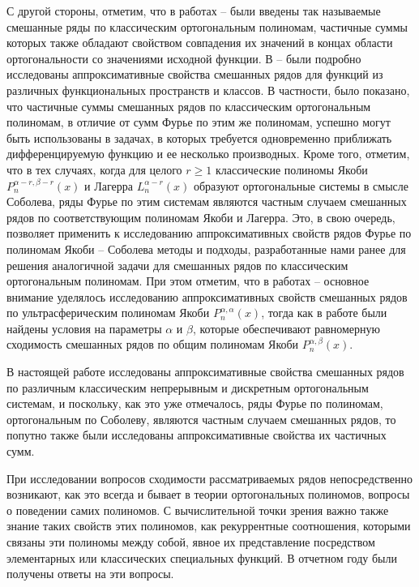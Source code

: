С другой стороны, отметим, что в работах  \cite{sob-jac-discrete-Shar11} -- \cite{sob-jac-discrete-Shar18}  были введены так называемые смешанные ряды по классическим ортогональным полиномам, частичные суммы которых также обладают свойством совпадения их значений в концах области ортогональности со значениями исходной функции.  В \cite{sob-jac-discrete-Shar11} -- \cite{sob-jac-discrete-Shar18} были подробно исследованы аппроксимативные свойства смешанных рядов для функций из различных функциональных пространств и классов. В частности, было показано, что частичные суммы смешанных рядов по классическим ортогональным полиномам, в отличие от сумм Фурье по этим же полиномам, успешно могут быть использованы в задачах, в которых требуется одновременно приближать дифференцируемую функцию и ее несколько производных. Кроме того, отметим, что в тех случаях, когда для целого $r\ge1$ классические полиномы Якоби $P_n^{\alpha-r,\beta-r}(x)$ и Лагерра $L_n^{\alpha-r}(x)$ образуют ортогональные системы в смысле Соболева, ряды Фурье по этим системам являются частным случаем смешанных рядов по соответствующим полиномам Якоби и Лагерра. Это, в свою очередь,  позволяет  применить к исследованию аппроксимативных свойств рядов Фурье по полиномам Якоби -- Соболева методы и подходы, разработанные нами ранее для решения аналогичной задачи для смешанных рядов по классическим ортогональным полиномам. При этом отметим, что в  работах
\cite{sob-jac-discrete-Shar11} -- \cite{sob-jac-discrete-Shar17} основное внимание уделялось исследованию аппроксимативных свойств смешанных рядов по ультрасферическим полиномам Якоби  $P_n^{\alpha,\alpha}(x)$, тогда как в работе \cite{sob-jac-discrete-Shar18} были найдены условия на параметры $\alpha$ и $\beta$, которые обеспечивают равномерную сходимость смешанных рядов по общим полиномам Якоби $P_n^{\alpha,\beta}(x)$.

В настоящей работе  исследованы  аппроксимативные свойства смешанных рядов по различным классическим непрерывным и дискретным ортогональным системам, и поскольку, как это уже отмечалось, ряды Фурье по полиномам, ортогональным по Соболеву, являются частным случаем смешанных рядов, то попутно также были исследованы  аппроксимативные свойства их частичных сумм.

При исследовании вопросов сходимости рассматриваемых рядов непосредственно возникают, как это всегда и бывает в теории ортогональных полиномов, вопросы о поведении самих полиномов. С вычислительной точки зрения важно также знание таких свойств этих полиномов, как рекуррентные соотношения, которыми связаны эти полиномы между собой, явное их представление посредством элементарных или классических специальных функций. В отчетном году были получены ответы на эти вопросы.

